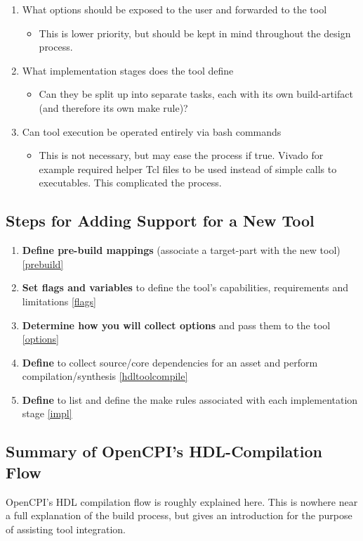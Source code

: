 \begin{enumerate}
	\item What options should be exposed to the user and forwarded to the tool
	\begin{itemize}
	\item This is lower priority, but should be kept in mind throughout the design process.
	\end{itemize}
	\item What implementation stages does the tool define
	\begin{itemize}
	\item Can they be split up into separate tasks, each with its own build-artifact (and therefore its own make rule)?
	\end{itemize}
	\item Can tool execution be operated entirely via bash commands
	\begin{itemize}
	\item This is not necessary, but may ease the process if true. Vivado for example required helper Tcl files to be used instead of simple calls to executables. This complicated the process.
	\end{itemize}
\end{enumerate}

\subsection{Steps for Adding Support for a New Tool}
\begin{enumerate}
\item \textbf{Define pre-build mappings} (associate a target-part with the new tool) \ref{prebuild}
\item \textbf{Set flags and variables} to define the tool's capabilities, requirements and limitations \ref{flags}
\item \textbf{Determine how you will collect options} and pass them to the tool \ref{options}
\item \textbf{Define } to collect source/core dependencies for an asset and perform compilation/synthesis \ref{hdltoolcompile}
\item \textbf{Define } to list and define the make rules associated with each implementation stage \ref{impl}
\end{enumerate}
\subsection{Summary of OpenCPI's HDL-Compilation Flow}
OpenCPI's  HDL compilation flow is roughly explained here. This is nowhere near a full explanation of the build process, but gives an introduction for the purpose of assisting tool integration.\newline

